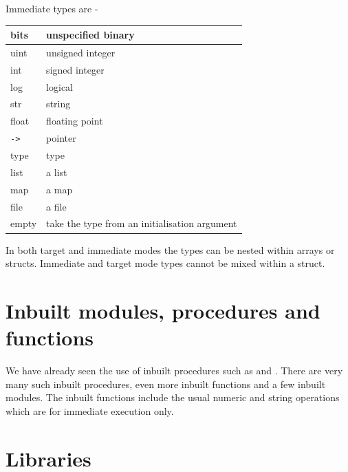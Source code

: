         Immediate types are -

        \begin{tabular}{| l | l |}
        \hline
        bits      & unspecified binary                              \\ \hline
        uint      & unsigned integer                                \\ \hline
        int       & signed integer                                  \\ \hline
        log       & logical                                         \\ \hline
        str       & string                                          \\ \hline
        float     & floating point                                  \\ \hline
        \verb'->' & pointer                                         \\ \hline
        type      & type                                            \\ \hline
        list      & a list                                          \\ \hline
        map       & a map                                           \\ \hline
        file      & a file                                          \\ \hline
        empty     & take the type from an initialisation argument   \\ \hline
        \end{tabular}

        In both target and immediate modes the types can be nested within
        arrays or structs. Immediate and target mode types cannot be mixed
        within a struct.


    \section{Inbuilt modules, procedures and functions}

        We have already seen the use of inbuilt procedures such as 
        and . There are very many such inbuilt procedures, even more
        inbuilt functions and a few inbuilt modules. The inbuilt functions include
        the usual numeric and string operations which are for immediate execution only.



    \section{Libraries}

